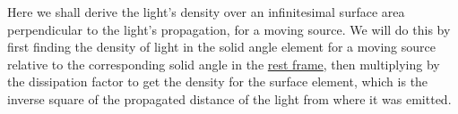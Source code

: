 
Here we shall derive the light's density over an infinitesimal surface area perpendicular to the light's propagation, for a moving source.
We will do this by first finding the density of light in the solid angle element for a moving source relative to the corresponding solid angle in the \hyperlink{def-proper-frame}{rest frame}, then multiplying by the dissipation factor to get the density for the surface element, which is the inverse square of the propagated distance of the light from where it was emitted.

